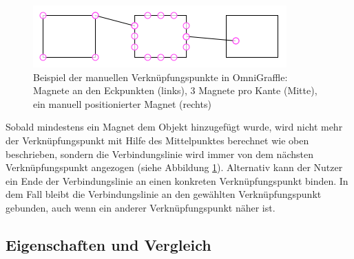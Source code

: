 \begin{figure}[hbt]
    \centering
    \includegraphics{resources/omnigraffle-magnets-example.png}
    \caption{Beispiel der manuellen Verknüpfungspunkte in OmniGraffle: Magnete an den Eckpunkten (links), 3 Magnete pro Kante (Mitte), ein manuell positionierter Magnet (rechts)}
    \label{fig:omnigraffle-magnets-example}
\end{figure}

Sobald mindestens ein Magnet dem Objekt hinzugefügt wurde, wird nicht mehr der Verknüpfungspunkt mit Hilfe des Mittelpunktes berechnet wie oben beschrieben, sondern die Verbindungslinie wird immer von dem nächsten Verknüpfungspunkt angezogen (siehe Abbildung \ref{fig:omnigraffle-magnets-example}). Alternativ kann der Nutzer ein Ende der Verbindungslinie an einen konkreten Verknüpfungspunkt binden. In dem Fall bleibt die Verbindungslinie an den gewählten Verknüpfungspunkt gebunden, auch wenn ein anderer Verknüpfungspunkt näher ist.

\subsection{Eigenschaften und Vergleich}




